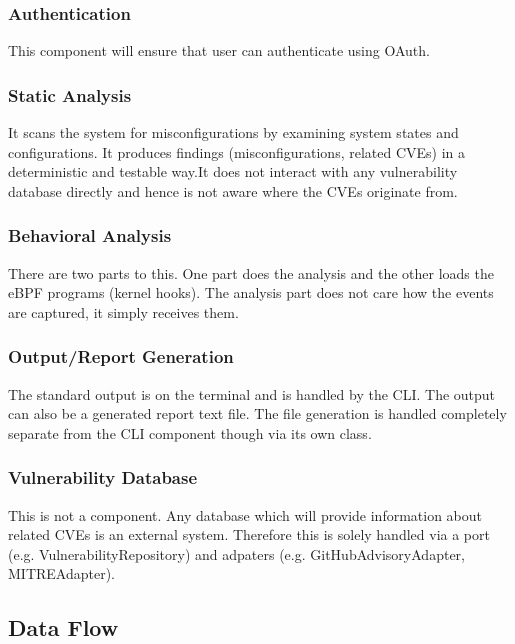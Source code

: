 \subsubsection{Authentication}

This component will ensure that user can authenticate using OAuth. 

\subsubsection{Static Analysis}

It scans the system for misconfigurations by examining system states and configurations. It produces findings (misconfigurations, related CVEs) in a deterministic and testable way.\newline It does not interact with any vulnerability database directly and hence is not aware where the CVEs originate from. 

\subsubsection{Behavioral Analysis}

There are two parts to this. One part does the analysis and the other loads the eBPF programs (kernel hooks). The analysis part does not care how the events are captured, it simply receives them.

\subsubsection{Output/Report Generation}

The standard output is on the terminal and is handled by the CLI. The output can also be a generated report text file. The file generation is handled completely separate from the CLI component though via its own class. 

\subsubsection{Vulnerability Database}

This is not a component. Any database which will provide information about related CVEs is an external system. Therefore this is solely handled via a port (e.g. VulnerabilityRepository) and adpaters (e.g. GitHubAdvisoryAdapter, MITREAdapter).

\subsection{Data Flow}

